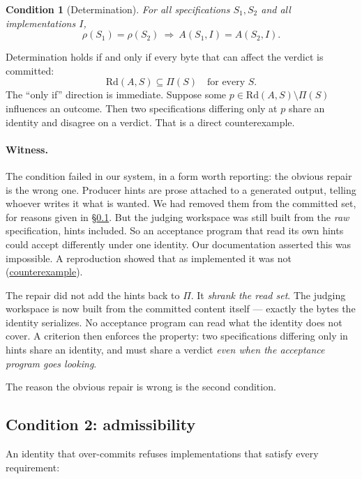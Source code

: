 \documentclass[10pt,twocolumn,letterpaper]{article}
\newcommand{\art}[2]{\href{https://github.com/rz4/reticuli/blob/5318acaac34ef99eeba9ff064a995a6313cc70ec/#1}{#2}}
\newtheorem{condition}{Condition}
\begin{document}
\begin{condition}[Determination]
\label{cond:det}
For all specifications $S_1,S_2$ and all implementations $I$,
\[\rho(S_1)=\rho(S_2)\ \Longrightarrow\ A(S_1,I)=A(S_2,I).\]
\end{condition}

\noindent Determination holds if and only if every byte that can affect the verdict is committed:
\begin{equation}
\mathrm{Rd}(A,S)\subseteq\Pi(S)\quad\text{for every }S.
\label{eq:det}
\end{equation}
The ``only if'' direction is immediate. Suppose some $p\in\mathrm{Rd}(A,S)\setminus\Pi(S)$ influences an outcome. Then two specifications differing only at $p$ share an identity and disagree on a verdict. That is a direct counterexample.

\paragraph{Witness.} The condition failed in our system, in a form worth reporting: the obvious repair is the wrong one. Producer hints are prose attached to a generated output, telling whoever writes it what is wanted. We had removed them from the committed set, for reasons given in §\ref{sec:adm}. But the judging workspace was still built from the \emph{raw} specification, hints included. So an acceptance program that read its own hints could accept differently under one identity. Our documentation asserted this was impossible. A reproduction showed that as implemented it was not (\art{research/audits/finding-a-repro}{counterexample}).

The repair did not add the hints back to $\Pi$. It \emph{shrank the read set}. The judging workspace is now built from the committed content itself --- exactly the bytes the identity serializes. No acceptance program can read what the identity does not cover. A criterion then enforces the property: two specifications differing only in hints share an identity, and must share a verdict \emph{even when the acceptance program goes looking}.

The reason the obvious repair is wrong is the second condition.

\subsection{Condition 2: admissibility}
\label{sec:adm}
An identity that over-commits refuses implementations that satisfy every requirement:
\end{document}
